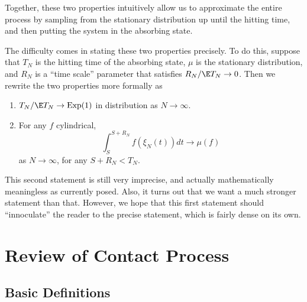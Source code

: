 \documentclass{scrartcl}
\DeclareMathOperator{\expDist}{Exp}
\begin{document}
Together, these two properties intuitively allow us to approximate the entire process by sampling from the stationary distribution up until the hitting time, and then putting the system in the absorbing state.

The difficulty comes in stating these two properties precisely. To do this, suppose that $T_{N}$ is the hitting time of the absorbing state, $\mu$ is the stationary distribution, 
and $R_{N}$ is a ``time scale'' parameter that satisfies $R_{N}/\E T_{N} \to 0$. Then we rewrite the two properties more formally as

\begin{enumerate}
  \item $T_{N} / \E T_{N} \to \expDist(1)$ in distribution as $N \to \infty$.
  \item For any $f$ cylindrical,
    \[ \int_{S}^{S + R_{N}} f(\xi_{N}(t)) dt \to \mu(f) \]
    as $N \to \infty$, for any $S + R_{N} < T_{N}$.
\end{enumerate}

This second statement is still very imprecise, and actually mathematically meaningless as currently posed. Also, it turns out that we want a much stronger statement than that. However, we hope that this first statement should ``innoculate'' the reader to the precise statement, which is fairly dense on its own.

\section{Review of Contact Process}

\subsection{Basic Definitions}
\end{document}
